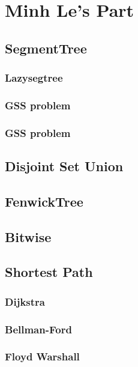 \chapter{Minh Le's Part}

\section{SegmentTree}
	\subsection{Lazysegtree}
	\subsection{GSS problem}
	\subsection{GSS problem}

\section{Disjoint Set Union}

\section{FenwickTree}

\section{Bitwise}
	
\section{Shortest Path}
	\subsection{Dijkstra}
	\subsection{Bellman-Ford}
	\subsection{Floyd Warshall}
